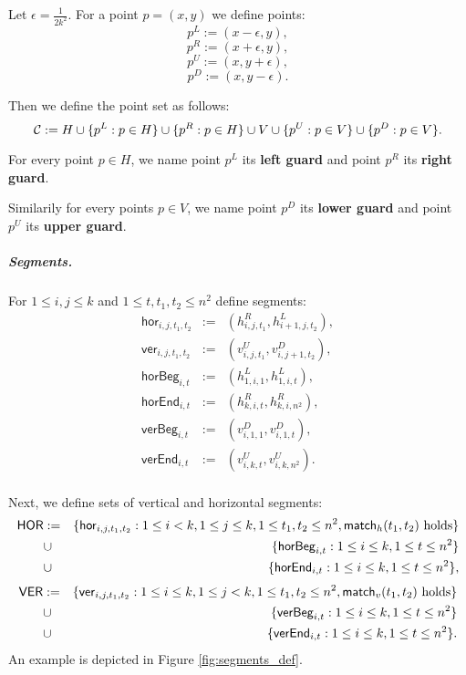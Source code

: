 Let $\epsilon = \frac{1}{2k^2}$.
For a point $p = (x, y)$ we define points:
$$p^{L} := (x - \epsilon, y),$$
$$p^{R} := (x + \epsilon, y),$$
$$p^{U} := (x, y + \epsilon),$$
$$p^{D} := (x, y - \epsilon).$$

Then we define the point set as follows:
$$\mathcal{C} := H \cup \{p^L : p \in H\} \cup \{p^R : p \in H\}
\cup V \cup \{p^U : p \in V\} \cup \{p^D : p \in V\}.$$

\begin{defi}
	\label{guard_def}
	For every point $p \in H$, we name point $p^L$ its \textbf{left guard}
	and point $p^R$ its \textbf{right guard}.
	
	Similarily for every points $p \in V$, we name point $p^D$ its \textbf{lower guard}
	and point $p^U$ its \textbf{upper guard}.
\end{defi}

\subparagraph{Segments.}
\newcommand{\hor}[4]{\mathsf{hor}_{#1,#2,#3,#4}}
\newcommand{\ver}[4]{\mathsf{ver}_{#1,#2,#3,#4}}
\newcommand{\horbeg}[2]{\mathsf{horBeg}_{#1,#2}}
\newcommand{\verbeg}[2]{\mathsf{verBeg}_{#1,#2}}
\newcommand{\horend}[2]{\mathsf{horEnd}_{#1,#2}}
\newcommand{\verend}[2]{\mathsf{verEnd}_{#1,#2}}

For $1 \le i,j \le k$ and $1 \le t, t_1, t_2 \le n^2$ define segments:
\begin{eqnarray*}
\hor{i}{j}{t_1}{t_2} & := & (h^R_{i,j,t_1}, h^L_{i+1, j, t_2}), \\
\ver{i}{j}{t_1}{t_2} & := & (v^U_{i,j,t_1}, v^D_{i, j+1, t_2}), \\
\horbeg{i}{t} & := & (h^L_{1, i, 1}, h^L_{1, i, t}), \\
\horend{i}{t} & := & (h^R_{k, i, t}, h^R_{k, i, n^2}), \\
\verbeg{i}{t} & := & (v^D_{i, 1, 1}, v^D_{i, 1, t}), \\
\verend{i}{t} & := & (v^U_{i, k, t}, v^U_{i, k, n^2}). \\
\end{eqnarray*}

\newcommand{\allhor}{\mathsf{HOR}}
\newcommand{\allver}{\mathsf{VER}}
\newcommand{\alldiag}{\mathsf{DIAG}}

Next, we define sets of vertical and horizontal segments:
\begin{eqnarray*}
\allhor &:= &\{\hor{i}{j}{t_1}{t_2} : 1 \le i < k, 1 \le j \le k,
1 \le t_1, t_2 \le n^2, \matchh(t_1, t_2) \text{ holds}\} \\
&\cup &\{\horbeg{i}{t} : 1 \le i \le k, 1 \le t \le n^2\}
\\
&\cup &\{\horend{i}{t} : 1 \le i \le k, 1 \le t \le n^2\},
\end{eqnarray*}
\begin{eqnarray*}
\allver &:= &\{\ver{i}{j}{t_1}{t_2} : 1 \le i \le k, 1 \le j < k,
1 \le t_1, t_2 \le n^2, \matchv(t_1, t_2) \text{ holds}\} \\
&\cup &\{\verbeg{i}{t} : 1 \le i \le k, 1 \le t \le n^2\}
\\
&\cup &\{\verend{i}{t} : 1 \le i \le k, 1 \le t \le n^2\}.
\end{eqnarray*}
An example is depicted in Figure \ref{fig:segments_def}.

